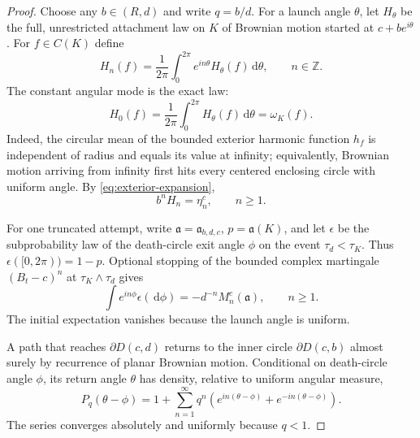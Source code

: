 \documentclass[11pt]{article}
\theoremstyle{mainthm}
\theoremstyle{definition}
\theoremstyle{remark}
\newcommand{\dd}{\,\mathrm d}
\begin{document}
\begin{proof}
Choose any $b\in(R,d)$ and write $q=b/d$. For a launch angle $\theta$, let $H_\theta$ be the full, unrestricted attachment law on $K$ of Brownian motion started at $c+be^{i\theta}$. For $f\in C(K)$ define
\[
  H_n(f)=\frac1{2\pi}\int_0^{2\pi}e^{in\theta}H_\theta(f)\dd\theta,
  \qquad n\in\mathbb Z.
\]
The constant angular mode is the exact law:
\begin{equation}
  H_0(f)=\frac1{2\pi}\int_0^{2\pi}H_\theta(f)\dd\theta
  =\omega_K(f).
  \label{eq:circle-average-exact}
\end{equation}
Indeed, the circular mean of the bounded exterior harmonic function $h_f$ is independent of radius and equals its value at infinity; equivalently, Brownian motion arriving from infinity first hits every centered enclosing circle with uniform angle. By \eqref{eq:exterior-expansion},
\begin{equation}
  b^nH_n=\eta_n^c,
  \qquad n\ge1.
  \label{eq:Hn-eta}
\end{equation}

For one truncated attempt, write $\mathfrak a=\mathfrak a_{b,d,c}$, $p=\mathfrak a(K)$, and let $\epsilon$ be the subprobability law of the death-circle exit angle $\phi$ on the event $\tau_d<\tau_K$. Thus $\epsilon([0,2\pi))=1-p$. Optional stopping of the bounded complex martingale $(B_t-c)^n$ at $\tau_K\wedge\tau_d$ gives
\begin{equation}
  \int e^{in\phi}\epsilon(\dd\phi)
  =-d^{-n}M_n^c(\mathfrak a),
  \qquad n\ge1.
  \label{eq:outward-mode}
\end{equation}
The initial expectation vanishes because the launch angle is uniform.

A path that reaches $\partial D(c,d)$ returns to the inner circle $\partial D(c,b)$ almost surely by recurrence of planar Brownian motion. Conditional on death-circle angle $\phi$, its return angle $\theta$ has density, relative to uniform angular measure,
\begin{equation}
  P_q(\theta-\phi)
  =1+\sum_{n=1}^{\infty}q^n
  \left(e^{in(\theta-\phi)}+e^{-in(\theta-\phi)}\right).
  \label{eq:poisson-series}
\end{equation}
The series converges absolutely and uniformly because $q<1$.


\end{proof}
\end{document}
